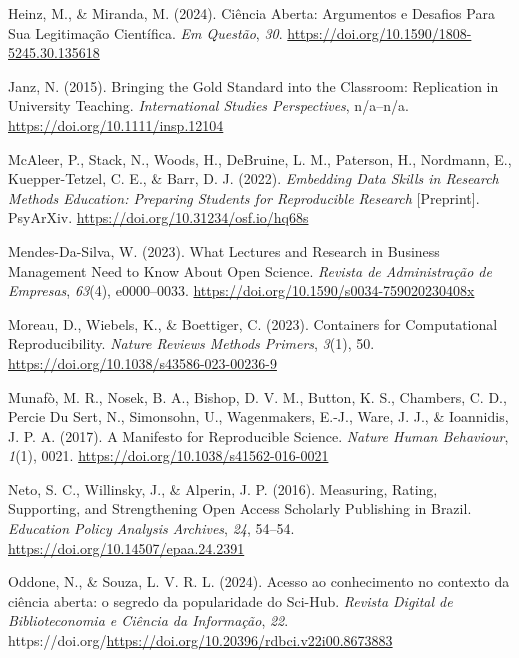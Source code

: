 \documentclass[
  a4paper,
]{article}
\newlength{\cslhangindent}
\newenvironment{CSLReferences}[2] %
 {\begin{list}{}{%
  \setlength{\itemindent}{0pt}
  \setlength{\leftmargin}{0pt}
  \setlength{\parsep}{0pt}
  \ifodd #1
   \setlength{\leftmargin}{\cslhangindent}
   \setlength{\itemindent}{-1\cslhangindent}
  \fi
  \setlength{\itemsep}{#2\baselineskip}}}
 {\end{list}}
\begin{document}
\begin{CSLReferences}{1}{0}
Heinz, M., \& Miranda, M. (2024). Ci{ê}ncia {Aberta}: Argumentos e
Desafios Para Sua Legitima{ç}{ã}o Cient{í}fica. \emph{Em Quest{ã}o},
\emph{30}. \url{https://doi.org/10.1590/1808-5245.30.135618}

Janz, N. (2015). Bringing the {Gold Standard} into the {Classroom}:
{Replication} in {University Teaching}. \emph{International Studies
Perspectives}, n/a--n/a. \url{https://doi.org/10.1111/insp.12104}

McAleer, P., Stack, N., Woods, H., DeBruine, L. M., Paterson, H.,
Nordmann, E., Kuepper-Tetzel, C. E., \& Barr, D. J. (2022).
\emph{Embedding {Data Skills} in {Research Methods Education}:
{Preparing Students} for {Reproducible Research}} {[}Preprint{]}.
PsyArXiv. \url{https://doi.org/10.31234/osf.io/hq68s}

Mendes-Da-Silva, W. (2023). What {Lectures} and {Research} in {Business
Management Need} to {Know About Open Science}. \emph{Revista de
Administra{ç}{ã}o de Empresas}, \emph{63}(4), e0000--0033.
\url{https://doi.org/10.1590/s0034-759020230408x}

Moreau, D., Wiebels, K., \& Boettiger, C. (2023). Containers for
Computational Reproducibility. \emph{Nature Reviews Methods Primers},
\emph{3}(1), 50. \url{https://doi.org/10.1038/s43586-023-00236-9}

Munafò, M. R., Nosek, B. A., Bishop, D. V. M., Button, K. S., Chambers,
C. D., Percie Du Sert, N., Simonsohn, U., Wagenmakers, E.-J., Ware, J.
J., \& Ioannidis, J. P. A. (2017). A Manifesto for Reproducible Science.
\emph{Nature Human Behaviour}, \emph{1}(1), 0021.
\url{https://doi.org/10.1038/s41562-016-0021}

Neto, S. C., Willinsky, J., \& Alperin, J. P. (2016). Measuring, Rating,
Supporting, and Strengthening Open Access Scholarly Publishing in
{Brazil}. \emph{Education Policy Analysis Archives}, \emph{24}, 54--54.
\url{https://doi.org/10.14507/epaa.24.2391}

Oddone, N., \& Souza, L. V. R. L. (2024). Acesso ao conhecimento no
contexto da ciência aberta: o segredo da popularidade do Sci-Hub.
\emph{Revista Digital de Biblioteconomia e Ciência da Informação},
\emph{22}.
https://doi.org/\url{https://doi.org/10.20396/rdbci.v22i00.8673883}


\end{CSLReferences}
\end{document}
